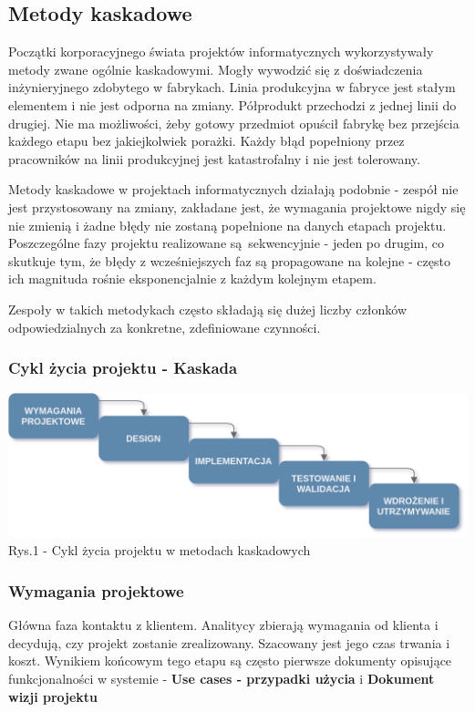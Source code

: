 \documentclass{article}
\begin{document}
\subsection{Metody kaskadowe}
Początki korporacyjnego świata projektów informatycznych wykorzystywały metody zwane ogólnie kaskadowymi. Mogły wywodzić się z doświadczenia inżynieryjnego zdobytego w fabrykach\cite{scrum}. Linia produkcyjna w fabryce jest
stałym elementem i nie jest odporna na zmiany. Półprodukt przechodzi z jednej linii do drugiej. Nie ma możliwości, żeby gotowy przedmiot opuścił fabrykę bez przejścia każdego etapu bez jakiejkolwiek porażki.
Każdy błąd popełniony przez pracowników na linii produkcyjnej jest katastrofalny i nie jest tolerowany.

Metody kaskadowe w projektach informatycznych działają podobnie - zespół nie jest przystosowany na zmiany, zakładane jest, że wymagania projektowe nigdy się nie zmienią i żadne błędy nie zostaną popełnione na danych etapach projektu. Poszczególne fazy projektu realizowane są sekwencyjnie - jeden po drugim, co skutkuje tym, że błędy z wcześniejszych faz są propagowane na kolejne - często ich magnituda rośnie eksponencjalnie z każdym kolejnym etapem.

Zespoły w takich metodykach często składają się dużej liczby członków odpowiedzialnych za konkretne, zdefiniowane czynności.

\subsubsection{Cykl życia projektu - Kaskada}
\begin{center}
    \includegraphics[scale=0.25]{waterfall_diagram.png}
    \newline
    Rys.1 - Cykl życia projektu w metodach kaskadowych
\end{center}

\subsubsection*{Wymagania projektowe}
Główna faza kontaktu z klientem. Analitycy zbierają wymagania od klienta i decydują, czy projekt zostanie zrealizowany. Szacowany jest jego czas trwania i koszt. Wynikiem końcowym tego etapu są często pierwsze dokumenty opisujące funkcjonalności w systemie - \textbf{Use cases - przypadki użycia} i \textbf{Dokument wizji projektu}
\end{document}
